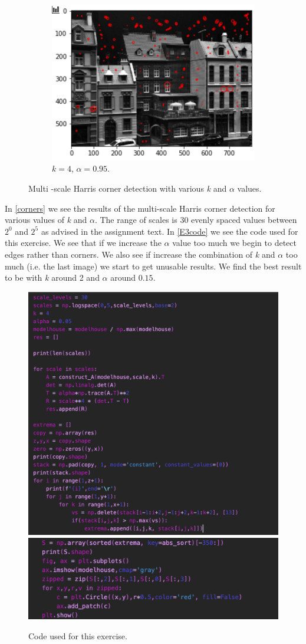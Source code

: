 \begin{figure}[H]
\begin{subfigure}[b]{0.4\linewidth}
		\includegraphics[width=\linewidth]{Materials/E3/k4a095}
		\caption{$k = 4$, $\alpha = 0.95$.}
	\end{subfigure}
	\caption{Multi -scale Harris corner detection with various \textit{k} and $\alpha$ values.}
	\label{corners}
\end{figure}
In \autoref{corners} we see the results of the multi-scale Harris corner detection for various values of \textit{k} and $\alpha$. The range of scales is 30 evenly spaced values between $2^0$ and $2^5$ as advised in the assignment text. In \autoref{E3code} we see the code used for this exercise. We see that if we increase the $\alpha$ value too much we begin to detect edges rather than corners. We also see if increase the combination of \textit{k} and $\alpha$ too much (i.e. the last image) we start to get unusable results. We find the best result to be with \textit{k} around 2 and $\alpha$ around $0.15$.

\begin{figure}[H]
	\centering
	\includegraphics[width=0.8\linewidth]{Materials/E3/code1}
	\includegraphics[width=0.8\linewidth]{Materials/E3/code2}
	\caption{Code used for this exercise.}
	\label{E3code}
\end{figure}